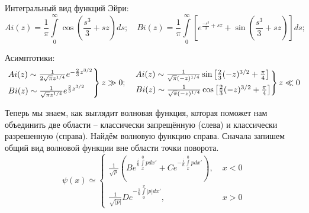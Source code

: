 Интегральный вид функций Эйри:
\[
Ai(z) = \frac{1}{\pi}\int\limits_{0}^{\infty}\cos(\frac{s^3}{3} + sz)ds; \quad Bi(z) = \frac{1}{\pi}\int\limits_{0}^{\infty}\left[e^{\frac{-s^3}{3} + sz} + \sin(\frac{s^3}{3} + sz)\right]ds;
\]

Асимптотики:
\[
\begin{rcases}
    Ai(z) \sim \frac{1}{2\sqrt{\pi}z^{1/4}}e^{-\frac{2}{3}z^{3/2}}\\
    Bi(z) \sim \frac{1}{\sqrt{\pi}z^{1/4}}e^{\frac{2}{3}z^{3/2}}
\end{rcases}
 z \gg 0;\quad
 \begin{rcases}
    Ai(z) \sim \frac{1}{\sqrt{\pi}(-z)^{1/4}}\sin\left[\frac{2}{3}(-z)^{3/2} + \frac{\pi}{4}\right]\\
    Bi(z) \sim \frac{1}{\sqrt{\pi}(-z)^{1/4}}\cos\left[\frac{2}{3}(-z)^{3/2} + \frac{\pi}{4}\right]
\end{rcases}
z\ll 0
\]

Теперь мы знаем, как выглядит волновая функция, которая поможет нам объединить две области -- классически запрещённую (слева) и классически разрешенную (справа). Найдём волновую функцию справа. Сначала запишем общий вид волновой функции вне области точки поворота. 
\[
\psi(x) \simeq
\begin{cases}
    \frac{1}{\sqrt{p}}\left(Be^{\frac{i}{\hbar}\int\limits_x^{0}p dx'} + Ce^{-\frac{i}{\hbar}\int\limits_x^{0}p dx'}\right), \; &x < 0\\
    \frac{1}{\sqrt{|p|}}De^{-\frac{1}{\hbar}\int\limits_0^{x}|p| dx'}, \; &x > 0
\end{cases}
\]

